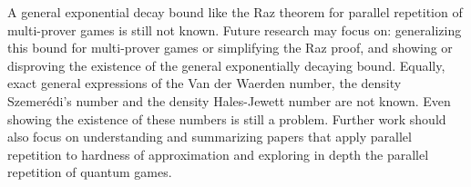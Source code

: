 A general exponential decay bound like the Raz theorem for parallel repetition of  multi-prover games is still not known. Future research may focus on: generalizing this bound for multi-prover games or simplifying the Raz proof, and showing or disproving the existence of the general exponentially decaying
bound. Equally,  exact general expressions of the Van der Waerden number, the density Szemerédi's number and the density Hales-Jewett number are not known. Even showing the existence of these numbers is still a problem.
Further work should also focus on understanding and summarizing papers that apply parallel repetition to hardness of approximation and exploring in depth the parallel repetition of quantum games.